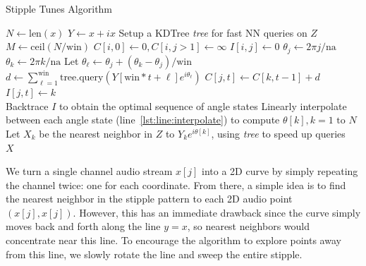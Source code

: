 \documentclass{article}
\begin{document}
\algrenewcommand\algorithmicindent{0.8em}%
\begin{algorithm}
  \caption{Stipple Tunes Algorithm}

  \begin{algorithmic}[1]
     
    \State $N \gets \text{len}(x)$ 
    \State $Y \gets x + ix$
    \State Setup a KDTree {\em tree} for fast NN queries on $Z$
    \State $M \gets \text{ceil}(N / \text{win})$
    \State $C[i, 0] \gets 0, C[i, j > 1] \gets \infty$ 
    \State $I[i, j] \gets 0$ 
            \State $\theta_j \gets 2 \pi j / \text{na}$
                \State $\theta_k \gets 2 \pi k / \text{na}$ \label{lst:line:interpolate}
                \State Let $\theta_{\ell} \gets \theta_j + (\theta_k-\theta_j)/\text{win}$ 
                \State $d \gets \sum_{\ell = 1}^{\text{win}} \text{tree.query}(Y[\text{win}*t + \ell] e^{i \theta_{\ell}})$ 
                    \State $C[j, t] \gets C[k, t-1] + d$ 
                    \State $I[j, t] \gets k$  
                \EndIf
            \EndFor
        \EndFor
    \EndFor \\
    \State Backtrace $I$ to obtain the optimal sequence of angle states
    \State Linearly interpolate between each angle state (line~\ref{lst:line:interpolate}) to compute $\theta[k], k = 1 \text{ to } N$ 
    \State Let $X_k$ be the nearest neighbor in $Z$ to $Y_k e^{i \theta[k]}$, using {\em tree} to speed up queries \\
    \Return $X$
    \EndProcedure
  \end{algorithmic}
  \label{alg:stippletunes}
\end{algorithm}

We turn a single channel audio stream $x[j]$ into a 2D curve by simply repeating the channel twice: one for each coordinate.  From there, a simple idea is to find the nearest neighbor in the stipple pattern to each 2D audio point $(x[j], x[j])$.  However, this has an immediate drawback since the curve simply moves back and forth along the line $y=x$, so nearest neighbors would concentrate near this line.  To encourage the algorithm to explore points away from this line, we slowly rotate the line and sweep the entire stipple.
\end{document}
